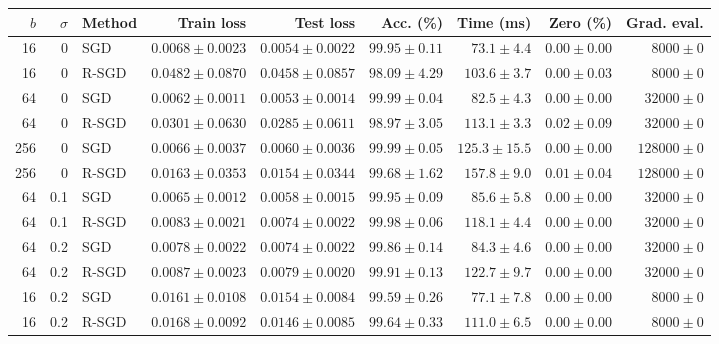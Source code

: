 \begin{tabular}{rrlrrrrrr}
\hline
$b$ & $\sigma$ & Method & Train loss & Test loss & Acc. (\%) & Time (ms) & Zero (\%) & Grad. eval. \\
\hline
16 & 0 & SGD & $0.0068 \pm 0.0023$ & $0.0054 \pm 0.0022$ & $99.95 \pm 0.11$ & $73.1 \pm 4.4$ & $0.00 \pm 0.00$ & $8000 \pm 0$ \\
16 & 0 & R-SGD & $0.0482 \pm 0.0870$ & $0.0458 \pm 0.0857$ & $98.09 \pm 4.29$ & $103.6 \pm 3.7$ & $0.00 \pm 0.03$ & $8000 \pm 0$ \\
64 & 0 & SGD & $0.0062 \pm 0.0011$ & $0.0053 \pm 0.0014$ & $99.99 \pm 0.04$ & $82.5 \pm 4.3$ & $0.00 \pm 0.00$ & $32000 \pm 0$ \\
64 & 0 & R-SGD & $0.0301 \pm 0.0630$ & $0.0285 \pm 0.0611$ & $98.97 \pm 3.05$ & $113.1 \pm 3.3$ & $0.02 \pm 0.09$ & $32000 \pm 0$ \\
256 & 0 & SGD & $0.0066 \pm 0.0037$ & $0.0060 \pm 0.0036$ & $99.99 \pm 0.05$ & $125.3 \pm 15.5$ & $0.00 \pm 0.00$ & $128000 \pm 0$ \\
256 & 0 & R-SGD & $0.0163 \pm 0.0353$ & $0.0154 \pm 0.0344$ & $99.68 \pm 1.62$ & $157.8 \pm 9.0$ & $0.01 \pm 0.04$ & $128000 \pm 0$ \\
64 & 0.1 & SGD & $0.0065 \pm 0.0012$ & $0.0058 \pm 0.0015$ & $99.95 \pm 0.09$ & $85.6 \pm 5.8$ & $0.00 \pm 0.00$ & $32000 \pm 0$ \\
64 & 0.1 & R-SGD & $0.0083 \pm 0.0021$ & $0.0074 \pm 0.0022$ & $99.98 \pm 0.06$ & $118.1 \pm 4.4$ & $0.00 \pm 0.00$ & $32000 \pm 0$ \\
64 & 0.2 & SGD & $0.0078 \pm 0.0022$ & $0.0074 \pm 0.0022$ & $99.86 \pm 0.14$ & $84.3 \pm 4.6$ & $0.00 \pm 0.00$ & $32000 \pm 0$ \\
64 & 0.2 & R-SGD & $0.0087 \pm 0.0023$ & $0.0079 \pm 0.0020$ & $99.91 \pm 0.13$ & $122.7 \pm 9.7$ & $0.00 \pm 0.00$ & $32000 \pm 0$ \\
16 & 0.2 & SGD & $0.0161 \pm 0.0108$ & $0.0154 \pm 0.0084$ & $99.59 \pm 0.26$ & $77.1 \pm 7.8$ & $0.00 \pm 0.00$ & $8000 \pm 0$ \\
16 & 0.2 & R-SGD & $0.0168 \pm 0.0092$ & $0.0146 \pm 0.0085$ & $99.64 \pm 0.33$ & $111.0 \pm 6.5$ & $0.00 \pm 0.00$ & $8000 \pm 0$ \\
\hline
\end{tabular}
